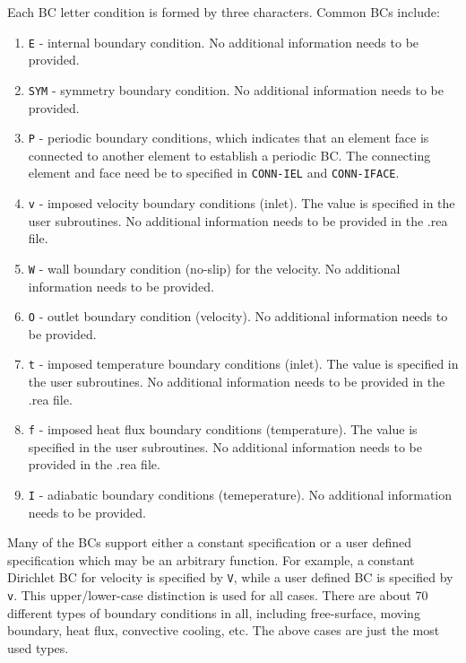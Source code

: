 \begin{description}
Each BC letter condition is formed by three characters. Common BCs include:
\begin{enumerate}
\item {\tt E} - internal boundary condition. No additional information needs to be provided.
\item {\tt SYM} - symmetry boundary condition. No additional information needs to be provided.
\item {\tt P} - periodic boundary conditions,  which indicates that an element face is connected to another element to establish a periodic BC. The connecting element and face need be  to specified in {\tt CONN-IEL} and {\tt CONN-IFACE}. 
\item {\tt v} - imposed velocity boundary conditions (inlet). The value is specified in the user subroutines. No additional information needs to be provided in the .rea file.
\item {\tt W} - wall boundary condition (no-slip) for the velocity. No additional information needs to be provided.
\item {\tt O} - outlet boundary condition (velocity). No additional information needs to be provided.
\item {\tt t} - imposed temperature  boundary conditions (inlet). The value is specified in the user subroutines. No additional information needs to be provided in the .rea file.
\item {\tt f} - imposed heat flux  boundary conditions (temperature). The value is specified in the user subroutines. No additional information needs to be provided in the .rea file.
\item {\tt I} - adiabatic boundary conditions (temeperature). No additional information needs to be provided.
\end{enumerate}

Many of the BCs support either a constant specification or a user defined specification which may be an arbitrary function.   For example, a constant Dirichlet BC for velocity is specified by {\tt V}, while a user defined BC is specified by {\tt v}.   This upper/lower-case distinction is  used for all cases.   There are about 70 different types of boundary conditions in all, including free-surface, moving boundary, heat flux, convective cooling, etc. The above cases are just the most used types.
    

\end{description}
